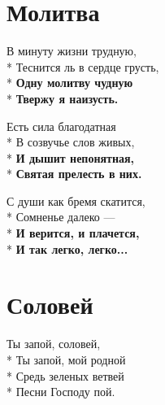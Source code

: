 \vspace{\fill}\newpage

\section{Молитва}
\label{song:Молитва}

\medskip

\begin{minipage}{\linewidth}
В минуту жизни трудную,\\*
Теснится ль в сердце грусть,\\*
\textbf{Одну молитву чудную}\\*
\textbf{Твержу я наизусть.}\\
\end{minipage}\par\medskip\nobreak

\medskip

\begin{minipage}{\linewidth}
Есть сила благодатная\\*
В созвучье слов живых,\\*
\textbf{И дышит непонятная,}\\*
\textbf{Святая прелесть в них.}\\
\end{minipage}\par\medskip\nobreak

\medskip

\begin{minipage}{\linewidth}
С души как бремя скатится,\\*
Сомненье далеко —\\*
\textbf{И верится, и плачется,}\\*
\textbf{И так легко, легко...}\\
\end{minipage}

\vspace{\fill}\newpage

\section{Соловей}
\label{song:Соловей}

\medskip

\begin{minipage}{\linewidth}
Ты запой, соловей,\\*
Ты запой, мой родной\\*
Средь зеленых ветвей\\*
Песни Господу пой.\\
\end{minipage}\par\medskip\nobreak

